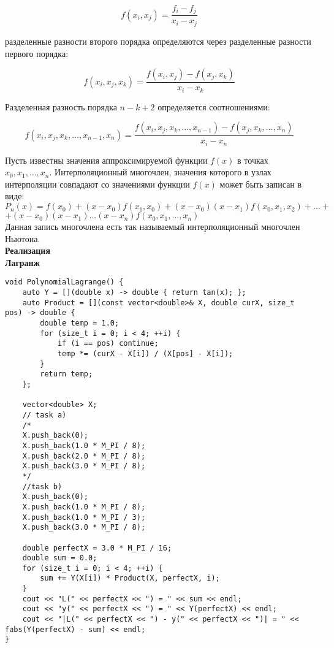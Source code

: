 $$
f(x_i, x_j)=\frac{f_i-f_j}{x_i-x_j}
$$

разделенные разности второго порядка определяются через разделенные разности первого порядка:

$$
f(x_i,x_j,x_k)=\frac{f(x_i,x_j)-f(x_j,x_k)}{x_i-x_k}
$$

Разделенная разность порядка $n-k+2$ определяется соотношениями:

$$
f(x_i,x_j,x_k,...,x_{n-1},x_n)=\frac{f(x_i,x_j,x_k,...,x_{n-1})-f(x_j,x_k,...,x_n)}{x_i-x_n}
$$

Пусть известны значения аппроксимируемой функции $f(x)$ в точках $x_0,x_1,...,x_n$. Интерполяционный многочлен, значения которого в узлах интерполяции совпадают со значениями функции $f(x)$ может быть записан в виде:\\

$P_n(x)=f(x_0)+(x-x_0)f(x_1,x_0)+(x-x_0)(x-x_1)f(x_0,x_1,x_2)+...+$\\
$+(x-x_0)(x-x_1)...(x-x_n)f(x_0,x_1,...,x_n)$\\

Данная запись многочлена есть так называемый интерполяционный многочлен Ньютона.\\

\textbf{Реализация}\\

\textbf{Лагранж}
\begin{lstlisting}
void PolynomialLagrange() {
	auto Y = [](double x) -> double { return tan(x); };
	auto Product = [](const vector<double>& X, double curX, size_t pos) -> double {
		double temp = 1.0;
		for (size_t i = 0; i < 4; ++i) {
			if (i == pos) continue;
			temp *= (curX - X[i]) / (X[pos] - X[i]);
		}
		return temp;
	};

	vector<double> X;
	// task a)
	/*
	X.push_back(0);
	X.push_back(1.0 * M_PI / 8);
	X.push_back(2.0 * M_PI / 8);
	X.push_back(3.0 * M_PI / 8);
	*/
	//task b)
	X.push_back(0);
	X.push_back(1.0 * M_PI / 8);
	X.push_back(1.0 * M_PI / 3);
	X.push_back(3.0 * M_PI / 8);

	double perfectX = 3.0 * M_PI / 16;
	double sum = 0.0;
	for (size_t i = 0; i < 4; ++i) {
		sum += Y(X[i]) * Product(X, perfectX, i);	
	}
	cout << "L(" << perfectX << ") = " << sum << endl;
	cout << "y(" << perfectX << ") = " << Y(perfectX) << endl;
	cout << "|L(" << perfectX << ") - y(" << perfectX << ")| = " << fabs(Y(perfectX) - sum) << endl;
}

\end{lstlisting}
\vspace{0.5cm}

